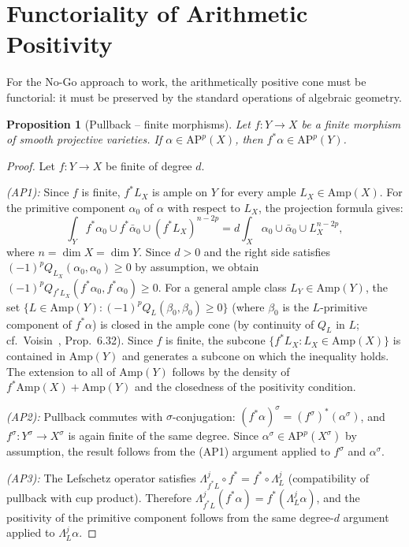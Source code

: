 \documentclass[aps,prd,twocolumn,superscriptaddress,nofootinbib]{revtex4-2}
\newtheorem{proposition}[theorem]{Proposition}
\theoremstyle{definition}
\theoremstyle{remark}
\begin{document}
\section{Functoriality of Arithmetic Positivity}
\label{sec:functoriality}

For the No-Go approach to work, the arithmetically positive cone must be functorial: it must be preserved by the standard operations of algebraic geometry.

\begin{proposition}[Pullback -- finite morphisms]
\label{prop:pullback}
Let $f: Y \to X$ be a finite morphism of smooth projective varieties. If $\alpha \in \mathrm{AP}^p(X)$, then $f^*\alpha \in \mathrm{AP}^p(Y)$.
\end{proposition}

\begin{proof}
Let $f: Y \to X$ be finite of degree $d$.

\textit{(AP1):} Since $f$ is finite, $f^*L_X$ is ample on $Y$ for every ample $L_X \in \mathrm{Amp}(X)$. For the primitive component $\alpha_0$ of $\alpha$ with respect to $L_X$, the projection formula gives:
\[
\int_Y f^*\alpha_0 \cup f^*\bar{\alpha}_0 \cup (f^*L_X)^{n-2p} = d \int_X \alpha_0 \cup \bar{\alpha}_0 \cup L_X^{n-2p},
\]
where $n = \dim X = \dim Y$. Since $d > 0$ and the right side satisfies $(-1)^p Q_{L_X}(\alpha_0, \alpha_0) \geq 0$ by assumption, we obtain $(-1)^p Q_{f^*L_X}(f^*\alpha_0, f^*\alpha_0) \geq 0$. For a general ample class $L_Y \in \mathrm{Amp}(Y)$, the set $\{L \in \mathrm{Amp}(Y) : (-1)^p Q_L(\beta_0, \beta_0) \geq 0\}$ (where $\beta_0$ is the $L$-primitive component of $f^*\alpha$) is closed in the ample cone (by continuity of $Q_L$ in $L$; cf.\ Voisin~\cite{Voisin2002}, Prop.\ 6.32). Since $f$ is finite, the subcone $\{f^*L_X : L_X \in \mathrm{Amp}(X)\}$ is contained in $\mathrm{Amp}(Y)$ and generates a subcone on which the inequality holds. The extension to all of $\mathrm{Amp}(Y)$ follows by the density of $f^*\mathrm{Amp}(X) + \mathrm{Amp}(Y)$ and the closedness of the positivity condition.

\textit{(AP2):} Pullback commutes with $\sigma$-conjugation: $(f^*\alpha)^\sigma = (f^\sigma)^*(\alpha^\sigma)$, and $f^\sigma: Y^\sigma \to X^\sigma$ is again finite of the same degree. Since $\alpha^\sigma \in \mathrm{AP}^p(X^\sigma)$ by assumption, the result follows from the (AP1) argument applied to $f^\sigma$ and $\alpha^\sigma$.

\textit{(AP3):} The Lefschetz operator satisfies $\Lambda_{f^*L}^j \circ f^* = f^* \circ \Lambda_L^j$ (compatibility of pullback with cup product). Therefore $\Lambda_{f^*L}^j(f^*\alpha) = f^*(\Lambda_L^j \alpha)$, and the positivity of the primitive component follows from the same degree-$d$ argument applied to $\Lambda_L^j\alpha$.
\end{proof}
\end{document}
